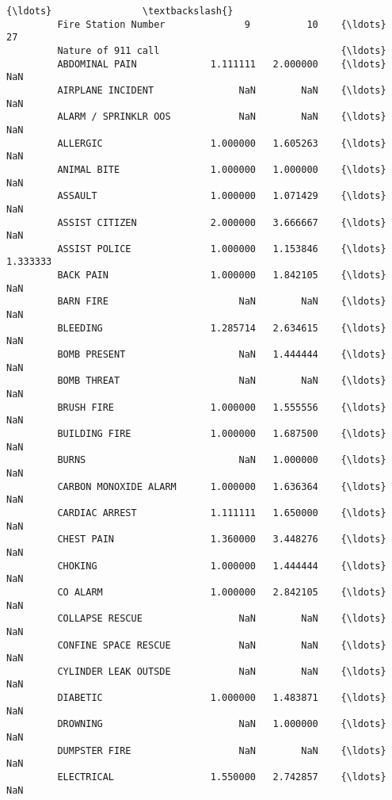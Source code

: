 \documentclass[11pt]{article}
\begin{document}
\begin{Verbatim}[commandchars=\\\{\}]
                                                           {\ldots}                \textbackslash{}
         Fire Station Number              9          10    {\ldots}            27   
         Nature of 911 call                                {\ldots}                 
         ABDOMINAL PAIN             1.111111   2.000000    {\ldots}           NaN   
         AIRPLANE INCIDENT               NaN        NaN    {\ldots}           NaN   
         ALARM / SPRINKLR OOS            NaN        NaN    {\ldots}           NaN   
         ALLERGIC                   1.000000   1.605263    {\ldots}           NaN   
         ANIMAL BITE                1.000000   1.000000    {\ldots}           NaN   
         ASSAULT                    1.000000   1.071429    {\ldots}           NaN   
         ASSIST CITIZEN             2.000000   3.666667    {\ldots}           NaN   
         ASSIST POLICE              1.000000   1.153846    {\ldots}      1.333333   
         BACK PAIN                  1.000000   1.842105    {\ldots}           NaN   
         BARN FIRE                       NaN        NaN    {\ldots}           NaN   
         BLEEDING                   1.285714   2.634615    {\ldots}           NaN   
         BOMB PRESENT                    NaN   1.444444    {\ldots}           NaN   
         BOMB THREAT                     NaN        NaN    {\ldots}           NaN   
         BRUSH FIRE                 1.000000   1.555556    {\ldots}           NaN   
         BUILDING FIRE              1.000000   1.687500    {\ldots}           NaN   
         BURNS                           NaN   1.000000    {\ldots}           NaN   
         CARBON MONOXIDE ALARM      1.000000   1.636364    {\ldots}           NaN   
         CARDIAC ARREST             1.111111   1.650000    {\ldots}           NaN   
         CHEST PAIN                 1.360000   3.448276    {\ldots}           NaN   
         CHOKING                    1.000000   1.444444    {\ldots}           NaN   
         CO ALARM                   1.000000   2.842105    {\ldots}           NaN   
         COLLAPSE RESCUE                 NaN        NaN    {\ldots}           NaN   
         CONFINE SPACE RESCUE            NaN        NaN    {\ldots}           NaN   
         CYLINDER LEAK OUTSDE            NaN        NaN    {\ldots}           NaN   
         DIABETIC                   1.000000   1.483871    {\ldots}           NaN   
         DROWNING                        NaN   1.000000    {\ldots}           NaN   
         DUMPSTER FIRE                   NaN        NaN    {\ldots}           NaN   
         ELECTRICAL                 1.550000   2.742857    {\ldots}           NaN   

\end{Verbatim}
\end{document}
